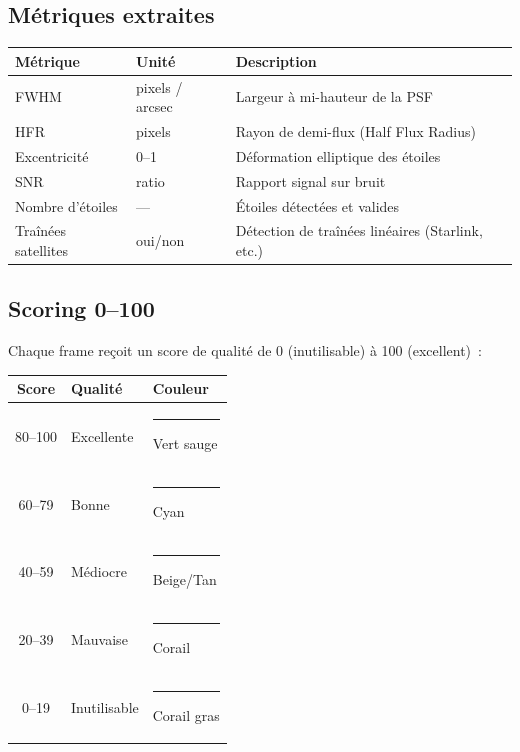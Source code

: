 \documentclass[a4paper,11pt]{article}
\begin{document}
\subsection{M\'{e}triques extraites}

\begin{center}
\begin{tabularx}{\textwidth}{l l X}
\toprule
\textbf{M\'{e}trique} & \textbf{Unit\'{e}} & \textbf{Description} \\
\midrule
FWHM & pixels / arcsec & Largeur \`{a} mi-hauteur de la PSF \\
HFR & pixels & Rayon de demi-flux (Half Flux Radius) \\
Excentricit\'{e} & 0--1 & D\'{e}formation elliptique des \'{e}toiles \\
SNR & ratio & Rapport signal sur bruit \\
Nombre d'\'{e}toiles & --- & \'{E}toiles d\'{e}tect\'{e}es et valides \\
Tra\^{i}n\'{e}es satellites & oui/non & D\'{e}tection de tra\^{i}n\'{e}es lin\'{e}aires (Starlink, etc.) \\
\bottomrule
\end{tabularx}
\end{center}

\subsection{Scoring 0--100}

Chaque frame re\c{c}oit un score de qualit\'{e} de 0 (inutilisable) \`{a} 100 (excellent)~:

\begin{center}
\begin{tabularx}{0.8\textwidth}{c l X}
\toprule
\textbf{Score} & \textbf{Qualit\'{e}} & \textbf{Couleur} \\
\midrule
80--100 & Excellente & \textcolor{successgreen}{\rule{1cm}{8pt}} Vert sauge \\
60--79 & Bonne & \textcolor{accentcyan}{\rule{1cm}{8pt}} Cyan \\
40--59 & M\'{e}diocre & \textcolor{warnorange}{\rule{1cm}{8pt}} Beige/Tan \\
20--39 & Mauvaise & \textcolor{errorcoral}{\rule{1cm}{8pt}} Corail \\
0--19 & Inutilisable & \textcolor{errorcoral}{\rule{1cm}{8pt}} Corail gras \\
\bottomrule
\end{tabularx}
\end{center}
\end{document}
